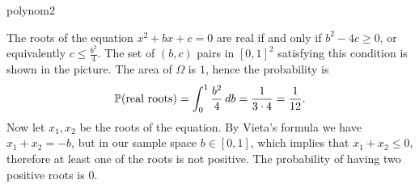 \begin{sol}{polynom2}
    \begin{figure}
    \centering
    \end{figure}
    The roots of the equation $x^2+bx+c=0$ are real if and only if $b^2-4c\ge0$, or equivalently $c\le\frac{b^2}{4}$. The set of $(b,c)$ pairs in $[0,1]^2$ satisfying this condition is shown in the picture. The area of $\Omega$ is $1$, hence the probability is
    \[
        \mathbb{P}(\text{real roots}) = \int_{0}^{1}\frac{b^2}{4}\,db=\frac{1}{3\cdot4}=\frac{1}{12}.
    \]
    Now let $x_1,x_2$ be the roots of the equation. By Vieta's formula we have $x_1+x_2=-b$, but in our sample space $b\in[0,1]$, which implies that $x_1+x_2\le0$, therefore at least one of the roots is not positive. The probability of having two positive roots is $0$.
\end{sol}

